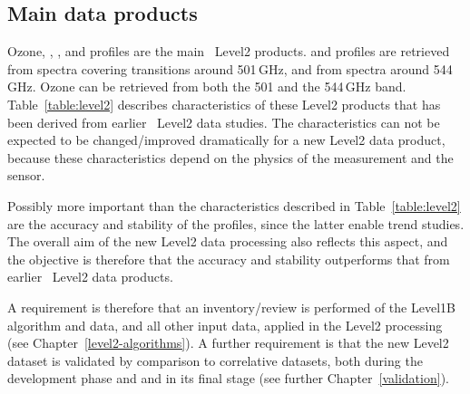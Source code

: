 
\subsection{Main data products}

Ozone, , , and  profiles
are the main \smr\ Level2 products.
 and  profiles are retrieved from spectra covering
transitions around 501\,GHz, and  from spectra around 544\,GHz.
Ozone can be retrieved from both the 501 and the 544\,GHz band.
Table~\ref{table:level2} describes characteristics of these Level2 products
that has been derived from earlier \smr\ Level2 data studies.
The characteristics can not be expected to be changed/improved dramatically
for a new Level2 data product,
because these characteristics depend on the physics of the measurement and
the sensor. 

Possibly more important than the characteristics described in
Table~\ref{table:level2} are the accuracy and stability of the profiles, since
the latter enable trend studies.
The overall aim of the new Level2 data processing also reflects
this aspect, and the objective is therefore that the accuracy
and stability outperforms that from earlier \smr\ Level2 data products. 

A requirement is therefore that an inventory/review is performed of the Level1B 
algorithm and data, and all other input data, 
applied in the Level2 processing
(see Chapter~\ref{level2-algorithms}).
A further requirement is that the new Level2 dataset
is validated by comparison to correlative datasets,
both during the development phase and and in its final stage 
(see further Chapter~\ref{validation}).





